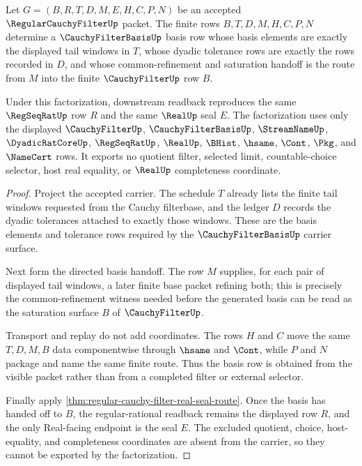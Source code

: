 \begin{theorem}
\label{thm:regular-cauchy-filter-basis-factorization}
Let $G=(B,R,T,D,M,E,H,C,P,N)$ be an accepted $\RegularCauchyFilterUp$ packet. The finite rows $B,T,D,M,H,C,P,N$ determine a $\CauchyFilterBasisUp$ basis row whose basis elements are exactly the displayed tail windows in $T$, whose dyadic tolerance rows are exactly the rows recorded in $D$, and whose common-refinement and saturation handoff is the route from $M$ into the finite $\CauchyFilterUp$ row $B$.

Under this factorization, downstream readback reproduces the same $\RegSeqRatUp$ row $R$ and the same $\RealUp$ seal $E$. The factorization uses only the displayed $\CauchyFilterUp$, $\CauchyFilterBasisUp$, $\StreamNameUp$, $\DyadicRatCoreUp$, $\RegSeqRatUp$, $\RealUp$, $\BHist$, $\hsame$, $\Cont$, $\Pkg$, and $\NameCert$ rows. It exports no quotient filter, selected limit, countable-choice selector, host real equality, or $\RealUp$ completeness coordinate.
\end{theorem}
\begin{proof}
Project the accepted carrier. The schedule $T$ already lists the finite tail windows requested from the Cauchy filterbase, and the ledger $D$ records the dyadic tolerances attached to exactly those windows. These are the basis elements and tolerance rows required by the $\CauchyFilterBasisUp$ carrier surface.

Next form the directed basis handoff. The row $M$ supplies, for each pair of displayed tail windows, a later finite base packet refining both; this is precisely the common-refinement witness needed before the generated basis can be read as the saturation surface $B$ of $\CauchyFilterUp$.

Transport and replay do not add coordinates. The rows $H$ and $C$ move the same $T,D,M,B$ data componentwise through $\hsame$ and $\Cont$, while $P$ and $N$ package and name the same finite route. Thus the basis row is obtained from the visible packet rather than from a completed filter or external selector.

Finally apply \autoref{thm:regular-cauchy-filter-real-seal-route}. Once the basis has handed off to $B$, the regular-rational readback remains the displayed row $R$, and the only Real-facing endpoint is the seal $E$. The excluded quotient, choice, host-equality, and completeness coordinates are absent from the carrier, so they cannot be exported by the factorization.
\end{proof}

